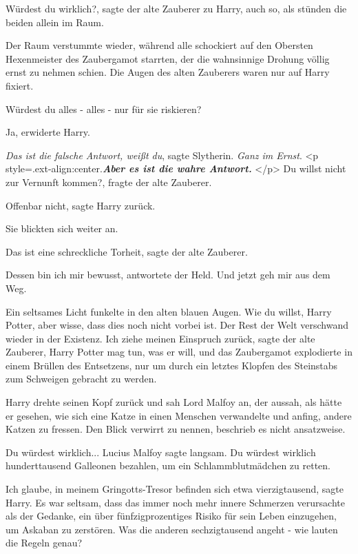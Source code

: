 \glqq Würdest du wirklich?\grqq{}, sagte der alte Zauberer zu Harry, auch so,
als stünden die beiden allein im Raum.

Der Raum verstummte wieder, während alle schockiert auf den Obersten
Hexenmeister des Zaubergamot starrten, der die wahnsinnige Drohung völlig ernst
zu nehmen schien. Die Augen des alten Zauberers waren nur auf Harry fixiert.

\glqq Würdest du alles - alles - nur für sie riskieren?\grqq{}

\glqq Ja\grqq{}, erwiderte Harry.

\emph{Das ist die falsche Antwort, weißt du}, sagte Slytherin. \emph{Ganz im
Ernst}.
\textbf{}
<p style=\grqq{}.ext-align:center\grqq{}.\textbf{\emph{Aber es ist die wahre
Antwort. }}</p>
\textbf{}
\glqq Du willst nicht zur Vernunft kommen?\grqq{}, fragte der alte Zauberer.

\glqq Offenbar nicht\grqq{}, sagte Harry zurück.

Sie blickten sich weiter an.

\glqq Das ist eine schreckliche Torheit\grqq{}, sagte der alte Zauberer.

\glqq Dessen bin ich mir bewusst\grqq{}, antwortete der Held. \glqq Und jetzt
geh mir aus dem Weg.\grqq{}

Ein seltsames Licht funkelte in den alten blauen Augen. \glqq Wie du willst,
Harry Potter, aber wisse, dass dies noch nicht vorbei ist.\grqq{} Der Rest der
Welt verschwand wieder in der Existenz. \glqq Ich ziehe meinen Einspruch
zurück\grqq{}, sagte der alte Zauberer, \glqq Harry Potter mag tun, was er
will\grqq{}, und das Zaubergamot explodierte in einem Brüllen des Entsetzens,
nur um durch ein letztes Klopfen des Steinstabs zum Schweigen gebracht zu
werden.

Harry drehte seinen Kopf zurück und sah Lord Malfoy an, der aussah, als hätte er
gesehen, wie sich eine Katze in einen Menschen verwandelte und anfing, andere
Katzen zu fressen. Den Blick verwirrt zu nennen, beschrieb es nicht ansatzweise.

\glqq Du würdest wirklich...\grqq{} Lucius Malfoy sagte langsam. \glqq Du
würdest wirklich hunderttausend Galleonen bezahlen, um ein Schlammblutmädchen zu
retten.\grqq{}

\glqq Ich glaube, in meinem Gringotts-Tresor befinden sich etwa
vierzigtausend\grqq{}, sagte Harry. Es war seltsam, dass das immer noch mehr
innere Schmerzen verursachte als der Gedanke, ein über fünfzigprozentiges Risiko
für sein Leben einzugehen, um Askaban zu zerstören. \glqq Was die anderen
sechzigtausend angeht - wie lauten die Regeln genau?\grqq{}

